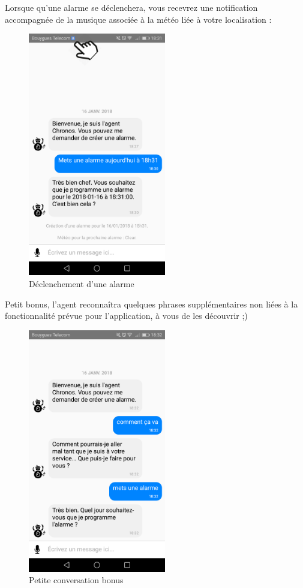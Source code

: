 Lorsque qu'une alarme se déclenchera, vous recevrez une notification accompagnée de la musique associée à la météo liée à votre localisation :

\begin{figure}[H]
  \centering
  \includegraphics[width=6cm]{images/H.png}
  \caption{Déclenchement d'une alarme}
\end{figure}

Petit bonus, l'agent reconnaîtra quelques phrases supplémentaires non liées à la fonctionnalité prévue pour l'application, à vous de les découvrir ;)

\begin{figure}[H]
  \centering
  \includegraphics[width=6cm]{images/J.png}
  \caption{Petite conversation bonus}
\end{figure}
